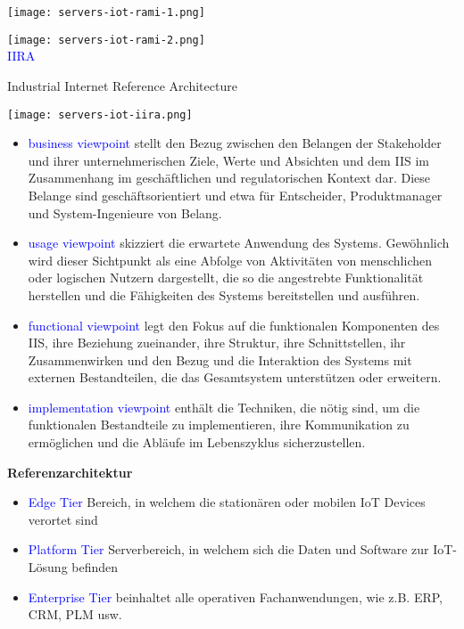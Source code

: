 \texttt{[image: servers-iot-rami-1.png]}

\texttt{[image: servers-iot-rami-2.png]} \\

\textcolor{blue}{IIRA}

Industrial Internet Reference Architecture

\texttt{[image: servers-iot-iira.png]}

\begin{itemize}
    \item \textcolor{blue}{business viewpoint} stellt den Bezug zwischen den Belangen der Stakeholder und ihrer unternehmerischen Ziele, Werte und Absichten und dem IIS im Zusammenhang im geschäftlichen und regulatorischen Kontext dar. Diese Belange sind geschäftsorientiert und etwa für Entscheider, Produktmanager und System-Ingenieure von Belang.
    \item \textcolor{blue}{usage viewpoint} skizziert die erwartete Anwendung des Systems. Gewöhnlich wird dieser Sichtpunkt als eine Abfolge von Aktivitäten von menschlichen oder logischen Nutzern dargestellt, die so die angestrebte Funktionalität herstellen und die Fähigkeiten des Systems bereitstellen und ausführen.
    \item \textcolor{blue}{functional viewpoint} legt den Fokus auf die funktionalen Komponenten des IIS, ihre Beziehung zueinander, ihre Struktur, ihre Schnittstellen, ihr Zusammenwirken und den Bezug und die Interaktion des Systems mit externen Bestandteilen, die das Gesamtsystem unterstützen oder erweitern.
    \item \textcolor{blue}{implementation viewpoint} enthält die Techniken, die nötig sind, um die funktionalen Bestandteile zu implementieren, ihre Kommunikation zu ermöglichen und die Abläufe im Lebenszyklus sicherzustellen.
\end{itemize}
\vspace{10pt}
\textbf{Referenzarchitektur}

\begin{itemize}
    \item \textcolor{blue}{Edge Tier} Bereich, in welchem die stationären oder mobilen IoT Devices verortet sind
    \item \textcolor{blue}{Platform Tier} Serverbereich, in welchem sich die Daten und Software zur IoT-Lösung befinden
    \item \textcolor{blue}{Enterprise Tier} beinhaltet alle operativen Fachanwendungen, wie z.B. ERP, CRM, PLM usw.
\end{itemize}

